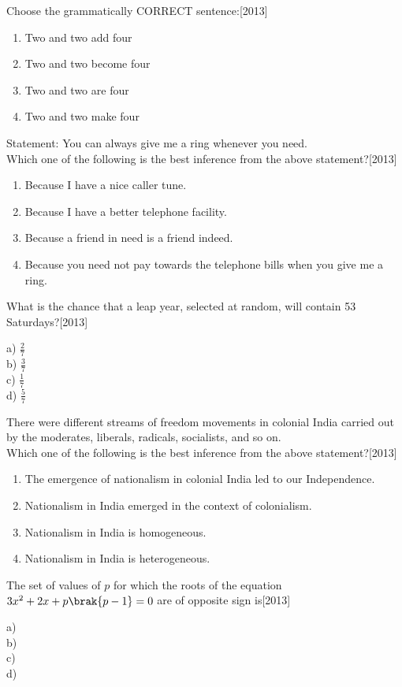 \item Choose the grammatically CORRECT sentence:\hfill{[2013]}
\begin{enumerate}
    \item Two and two add four
    \item Two and two become four
    \item Two and two are four
    \item Two and two make four
\end{enumerate}
\item Statement: You can always give me a ring whenever you need.\\
Which one of the following is the best inference from the above statement?\hfill{[2013]}
\begin{enumerate}
    \item Because I have a nice caller tune.
    \item Because I have a better telephone facility.
    \item Because a friend in need is a friend indeed.
    \item Because you need not pay towards the telephone bills when you give me a ring.
\end{enumerate}

\item What is the chance that a leap year, selected at random, will contain 53 Saturdays?\hfill{[2013]}
\begin{multicols}{4}
     a) $\frac{2}{7}$\\
     b) $\frac{3}{7}$\\
     c) $\frac{1}{7}$\\
     d) $\frac{5}{7}$
 \end{multicols}

\item There were different streams of freedom movements in colonial India carried out by the moderates, liberals, radicals, socialists, and so on.\\
Which one of the following is the best inference from the above statement?\hfill{[2013]}
\begin{enumerate}
    \item The emergence of nationalism in colonial India led to our Independence.
    \item Nationalism in India emerged in the context of colonialism.
    \item Nationalism in India is homogeneous.
    \item Nationalism in India is heterogeneous.
\end{enumerate}
\item The set of values of $p$ for which the roots of the equation $3x^2+2x+p\brak{p-1}=0$ are of opposite sign is\hfill{[2013]}
\begin{multicols}{4}
     a) \\
     b) \\
     c) \\
     d) 
 \end{multicols}

